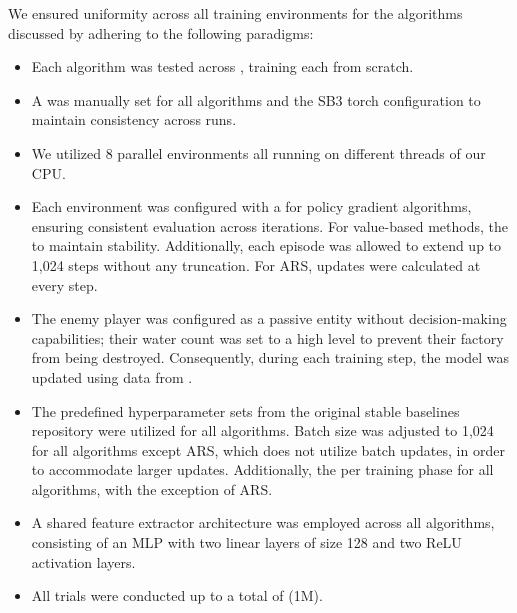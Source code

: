 \noindent We ensured uniformity across all training environments for the algorithms discussed by adhering to the following paradigms:

\begin{itemize}[itemsep=4pt, parsep=0pt]

\item Each algorithm was tested across , training each from scratch.

\item A  was manually set for all algorithms and the SB3 torch configuration to maintain consistency across runs.

\item We utilized 8 parallel environments all running on different threads of our CPU.

\item Each environment was configured with a  for policy gradient algorithms, ensuring consistent evaluation across iterations. For value-based methods, the  to maintain stability. Additionally, each episode was allowed to extend up to 1,024 steps without any truncation. For ARS, updates were calculated at every step.

\item The enemy player was configured as a passive entity without decision-making capabilities; their water count was set to a high level to prevent their factory from being destroyed. Consequently, during each training step, the model was updated using data from .

\item The predefined hyperparameter sets from the original stable baselines repository were utilized for all algorithms. Batch size was adjusted to 1,024 for all algorithms except ARS, which does not utilize batch updates, in order to accommodate larger updates. Additionally, the  per training phase for all algorithms, with the exception of ARS.

\item A shared feature extractor architecture was employed across all algorithms, consisting of an MLP with two linear layers of size 128 and two ReLU activation layers.

\item All trials were conducted up to a total of  (1M).

\end{itemize}


